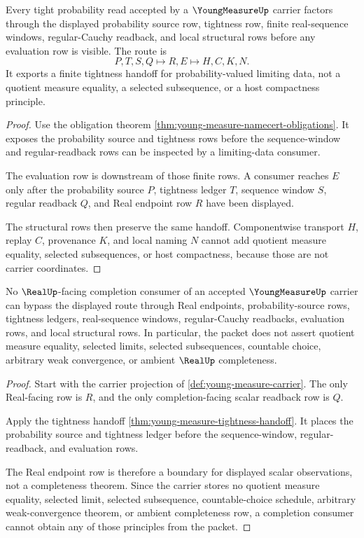 \begin{theorem}
\label{thm:young-measure-tightness-handoff}
Every tight probability read accepted by a $\YoungMeasureUp$ carrier factors through the displayed probability source row, tightness row, finite real-sequence windows, regular-Cauchy readback, and local structural rows before any evaluation row is visible. The route is
$$
P,T,S,Q \longmapsto R,E \longmapsto H,C,K,N .
$$
It exports a finite tightness handoff for probability-valued limiting data, not a quotient measure equality, a selected subsequence, or a host compactness principle.
\end{theorem}
\begin{proof}
Use the obligation theorem \autoref{thm:young-measure-namecert-obligations}. It exposes the probability source and tightness rows before the sequence-window and regular-readback rows can be inspected by a limiting-data consumer.

The evaluation row is downstream of those finite rows. A consumer reaches $E$ only after the probability source $P$, tightness ledger $T$, sequence window $S$, regular readback $Q$, and Real endpoint row $R$ have been displayed.

The structural rows then preserve the same handoff. Componentwise transport $H$, replay $C$, provenance $K$, and local naming $N$ cannot add quotient measure equality, selected subsequences, or host compactness, because those are not carrier coordinates.
\end{proof}

\begin{theorem}
\label{thm:young-measure-real-completion-boundary}
No $\RealUp$-facing completion consumer of an accepted $\YoungMeasureUp$ carrier can bypass the displayed route through Real endpoints, probability-source rows, tightness ledgers, real-sequence windows, regular-Cauchy readbacks, evaluation rows, and local structural rows. In particular, the packet does not assert quotient measure equality, selected limits, selected subsequences, countable choice, arbitrary weak convergence, or ambient $\RealUp$ completeness.
\end{theorem}
\begin{proof}
Start with the carrier projection of \autoref{def:young-measure-carrier}. The only Real-facing row is $R$, and the only completion-facing scalar readback row is $Q$.

Apply the tightness handoff \autoref{thm:young-measure-tightness-handoff}. It places the probability source and tightness ledger before the sequence-window, regular-readback, and evaluation rows.

The Real endpoint row is therefore a boundary for displayed scalar observations, not a completeness theorem. Since the carrier stores no quotient measure equality, selected limit, selected subsequence, countable-choice schedule, arbitrary weak-convergence theorem, or ambient completeness row, a completion consumer cannot obtain any of those principles from the packet.
\end{proof}

